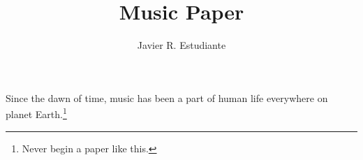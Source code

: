 \documentclass{studentpaper}
\title{Music Paper}
\author{Javier R. Estudiante}
\begin{document}
Since the dawn of time, music has been a part of human life everywhere on planet Earth.\footnote
	{Never begin a paper like this.}
\end{document}
